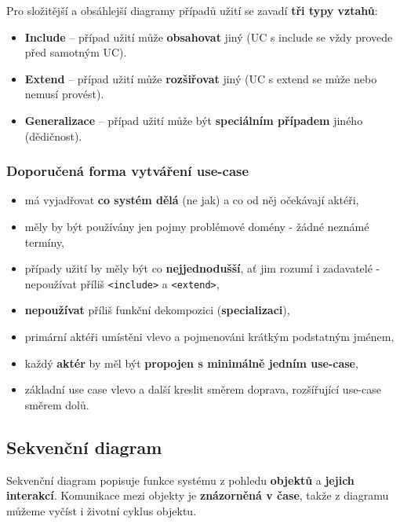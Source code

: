 \noindent Pro složitější a obsáhlejší diagramy případů užití se zavadí \textbf{tři typy vztahů}:
\begin{itemize}
\item \textbf{Include} – případ užití může \textbf{obsahovat} jiný (UC s include se vždy provede před samotným UC).
\item \textbf{Extend} – případ užití může \textbf{rozšiřovat} jiný (UC s extend se může nebo nemusí provést).
\item \textbf{Generalizace} – případ užití může být \textbf{speciálním případem} jiného (dědičnost).
\end{itemize}

\subsubsection{Doporučená forma vytváření use-case}
\begin{itemize}
\item má vyjadřovat \textbf{co systém dělá} (ne jak) a co od něj očekávají aktéři,
\item měly by být používány jen pojmy problémové domény - žádné neznámé termíny,
\item případy užití by měly být co \textbf{nejjednodušší}, ať jim rozumí i zadavatelé - nepoužívat příliš \texttt{<include>} a \texttt{<extend>},
\item \textbf{nepoužívat} příliš funkční dekompozici (\textbf{specializaci}),
\item primární aktéři umístěni vlevo a pojmenováni krátkým podstatným jménem,
\item každý \textbf{aktér} by měl být \textbf{propojen s minimálně jedním use-case},
\item základní use case vlevo a další kreslit směrem doprava, rozšířující use-case směrem dolů.
\end{itemize}

\subsection{Sekvenční diagram}
Sekvenční diagram popisuje funkce systému z pohledu \textbf{objektů} a\textbf{ jejich interakcí}. Komunikace mezi objekty je \textbf{znázorněná v čase}, takže z diagramu můžeme vyčíst i životní cyklus objektu. 

